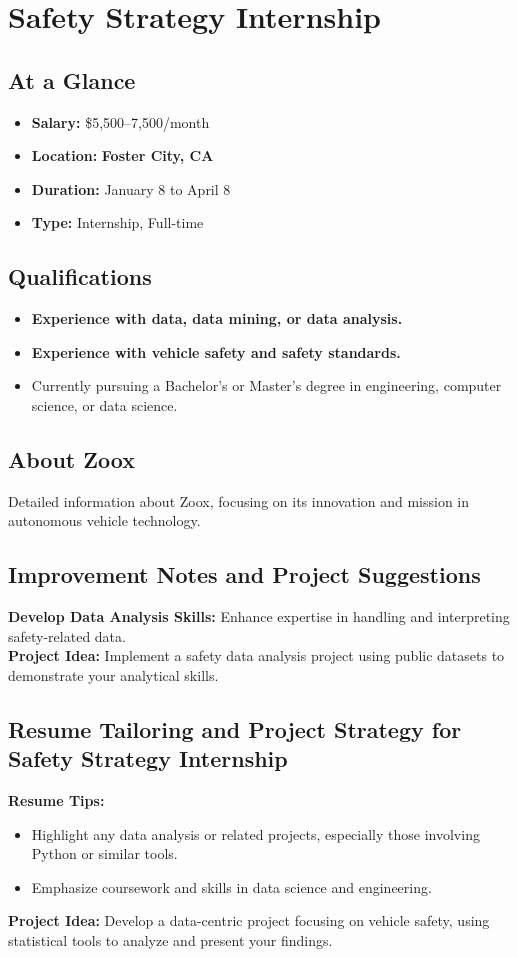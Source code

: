 \section*{Safety Strategy Internship}
\subsection*{At a Glance}
\begin{itemize}
    \item \textbf{Salary:} \$5,500–7,500/month
    \item \textbf{Location:} \textbf{Foster City, CA}
    \item \textbf{Duration:} January 8 to April 8
    \item \textbf{Type:} Internship, Full-time
\end{itemize}

\subsection*{Qualifications}
\begin{itemize}
    \item \textbf{Experience with data, data mining, or data analysis.}
    \item \textbf{Experience with vehicle safety and safety standards.}
    \item Currently pursuing a Bachelor’s or Master’s degree in engineering, computer science, or data science.
\end{itemize}

\subsection*{About Zoox}
Detailed information about Zoox, focusing on its innovation and mission in autonomous vehicle technology.

\subsection*{Improvement Notes and Project Suggestions}
\textbf{Develop Data Analysis Skills:} Enhance expertise in handling and interpreting safety-related data.\\
\textbf{Project Idea:} Implement a safety data analysis project using public datasets to demonstrate your analytical skills.

\subsection*{Resume Tailoring and Project Strategy for Safety Strategy Internship}
\textbf{Resume Tips:}
\begin{itemize}
    \item Highlight any data analysis or related projects, especially those involving Python or similar tools.
    \item Emphasize coursework and skills in data science and engineering.
\end{itemize}

\textbf{Project Idea:}
Develop a data-centric project focusing on vehicle safety, using statistical tools to analyze and present your findings.

